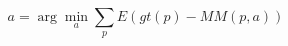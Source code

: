 \begin{equation}
    \label{eq:indirect-estimation}
    a = \arg \min_a \sum_p E(gt(p) - MM(p, a))
\end{equation}
